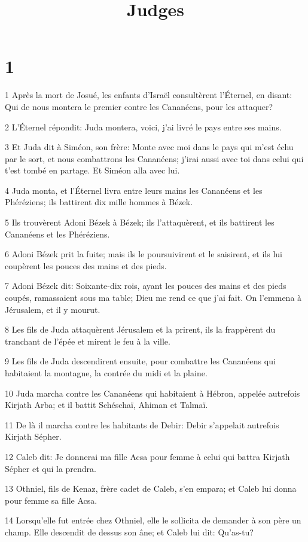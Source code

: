 

\title{Judges}


\chapter{1}

\par 1 Après la mort de Josué, les enfants d'Israël consultèrent l'Éternel, en disant: Qui de nous montera le premier contre les Cananéens, pour les attaquer?
\par 2 L'Éternel répondit: Juda montera, voici, j'ai livré le pays entre ses mains.
\par 3 Et Juda dit à Siméon, son frère: Monte avec moi dans le pays qui m'est échu par le sort, et nous combattrons les Cananéens; j'irai aussi avec toi dans celui qui t'est tombé en partage. Et Siméon alla avec lui.
\par 4 Juda monta, et l'Éternel livra entre leurs mains les Cananéens et les Phéréziens; ils battirent dix mille hommes à Bézek.
\par 5 Ils trouvèrent Adoni Bézek à Bézek; ils l'attaquèrent, et ils battirent les Cananéens et les Phéréziens.
\par 6 Adoni Bézek prit la fuite; mais ils le poursuivirent et le saisirent, et ils lui coupèrent les pouces des mains et des pieds.
\par 7 Adoni Bézek dit: Soixante-dix rois, ayant les pouces des mains et des pieds coupés, ramassaient sous ma table; Dieu me rend ce que j'ai fait. On l'emmena à Jérusalem, et il y mourut.
\par 8 Les fils de Juda attaquèrent Jérusalem et la prirent, ils la frappèrent du tranchant de l'épée et mirent le feu à la ville.
\par 9 Les fils de Juda descendirent ensuite, pour combattre les Cananéens qui habitaient la montagne, la contrée du midi et la plaine.
\par 10 Juda marcha contre les Cananéens qui habitaient à Hébron, appelée autrefois Kirjath Arba; et il battit Schéschaï, Ahiman et Talmaï.
\par 11 De là il marcha contre les habitants de Debir: Debir s'appelait autrefois Kirjath Sépher.
\par 12 Caleb dit: Je donnerai ma fille Acsa pour femme à celui qui battra Kirjath Sépher et qui la prendra.
\par 13 Othniel, fils de Kenaz, frère cadet de Caleb, s'en empara; et Caleb lui donna pour femme sa fille Acsa.
\par 14 Lorsqu'elle fut entrée chez Othniel, elle le sollicita de demander à son père un champ. Elle descendit de dessus son âne; et Caleb lui dit: Qu'as-tu?
